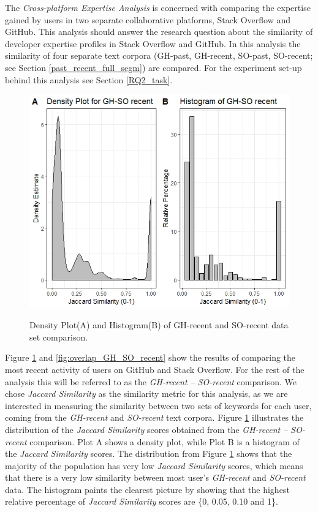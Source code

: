         The \emph{Cross-platform Expertise Analysis} is concerned with comparing the expertise gained by users in two separate collaborative platforms, Stack Overflow and GitHub. This analysis should answer the research question about the similarity of developer expertise profiles in Stack Overflow and GitHub. In this analysis the similarity of four separate text corpora (GH-past, GH-recent, SO-past, SO-recent; see Section \ref{past_recent_full_segm}) are compared. For the experiment set-up behind this analysis see Section \ref{RQ2_task}.
        
        \begin{figure}
          \centering
          \includegraphics[width=\textwidth]{figures/GH_SO_recent.jpeg}\\
          \caption{Density Plot(A) and Histogram(B) of GH-recent and SO-recent data set comparison.}
          \label{fig:GH_SO_recent}
        \end{figure}
        
        Figure \ref{fig:GH_SO_recent} and \ref{fig:overlap_GH_SO_recent} show the results of comparing the most recent activity of users on GitHub and Stack Overflow. For the rest of the analysis this will be referred to as the \emph{GH-recent -- SO-recent} comparison. We chose \emph{Jaccard Similarity} as the similarity metric for this analysis, as we are interested in measuring the similarity between two sets of keywords for each user, coming from the \emph{GH-recent} and \emph{SO-recent} text corpora. Figure \ref{fig:GH_SO_recent} illustrates the distribution of the \emph{Jaccard Similarity} scores obtained from the \emph{GH-recent -- SO-recent} comparison. Plot A shows a density plot, while Plot B is a  histogram of the \emph{Jaccard Similarity} scores. The distribution from Figure \ref{fig:GH_SO_recent} shows that the majority of the population has very low \emph{Jaccard Similarity} scores, which means that there is a very low similarity between most user's \emph{GH-recent} and \emph{SO-recent} data. The histogram paints the clearest picture by showing that the highest relative percentage of \emph{Jaccard Similarity} scores are \{0, 0.05, 0.10 and 1\}.
        

